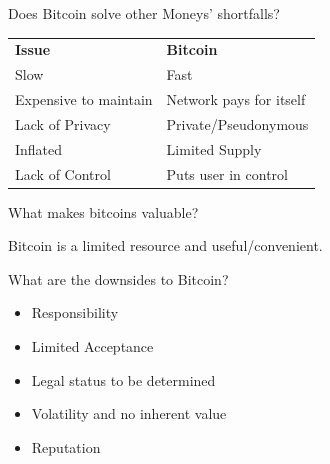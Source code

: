 \documentclass[12pt, usepdftitle=false]{beamer}
\begin{document}

\begin{frame}{Does Bitcoin solve other Moneys' shortfalls?}

\begin{table}[h]
	\begin{tabular}{ll}
\vspace{.5em}
\textbf{Issue} & \textbf{Bitcoin} \\
	Slow & Fast \\
	Expensive to maintain & Network pays for itself \\
	Lack of Privacy & Private/Pseudonymous \\
	Inflated & Limited Supply\\
	Lack of Control & Puts user in control
	\end{tabular}
\end{table}

\end{frame}


\begin{frame}{What makes bitcoins valuable?}

Bitcoin is a limited resource and useful/convenient.

\end{frame}


\begin{frame}{What are the downsides to Bitcoin?}
	\begin{itemize}
		\pause\item Responsibility
		\pause\item Limited Acceptance
		\pause\item Legal status to be determined
		\pause\item Volatility and no inherent value
		\pause\item Reputation
	\end{itemize}
\end{frame}

\end{document}

